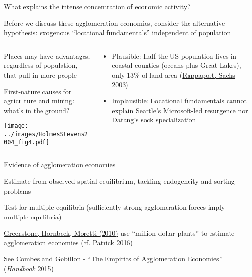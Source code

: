 \documentclass[11pt,notes=hide,aspectratio=169]{beamer}
\begin{document}
\begin{frame}{What explains the intense concentration of economic activity?}
{Before we discuss these agglomeration economies, consider the alternative hypothesis:
exogenous ``locational fundamentals'' independent of population\par}
\vspace{3mm}
\begin{columns}
\begin{column}{0.56\textwidth}	
{Places may have advantages, regardless of population, that pull in more people\par}
{First-nature causes for agriculture and mining: what's in the ground?\par}
\texttt{[image: ../images/HolmesStevens2004\_fig4.pdf]}
\end{column}
\begin{column}{0.43\textwidth}	
\begin{itemize}
\item Plausible:
Half the US population lives in coastal counties (oceans plus Great Lakes), only 13\% of land area
(\href{https://www.jstor.org/stable/40215936}{Rappaport, Sachs 2003})
\item Implausible: Locational fundamentals cannot explain Seattle's Microsoft-led resurgence nor Datang's sock specialization
\end{itemize}
\end{column}
\end{columns}
\end{frame}
\begin{frame}{Evidence of agglomeration economies}
\begin{itemize}{
	\item Estimate from observed spatial equilibrium, tackling endogeneity and sorting problems
	\item Test for multiple equilibria (sufficiently strong agglomeration forces imply multiple equilibria)
	\item \href{https://www.journals.uchicago.edu/doi/abs/10.1086/653714}{Greenstone, Hornbeck, Moretti (2010)} use ``million-dollar plants'' to estimate agglomeration economies
  (cf. \href{https://onlinelibrary.wiley.com/doi/abs/10.1111/ecin.12339}{Patrick 2016})
}\end{itemize}
See Combes and Gobillon - ``\href{https://www.sciencedirect.com/science/article/pii/B9780444595171000052}{The Empirics of Agglomeration Economies}'' (\textit{Handbook} 2015)
\end{frame}
\end{document}
